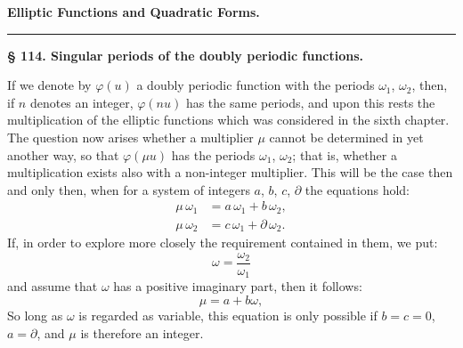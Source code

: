 \begin{center}

\textbf{\Large Elliptic Functions and Quadratic Forms.}

\rule{0.12\linewidth}{0.4pt}
\end{center}

\textbf{§ 114. Singular periods of the doubly periodic functions.}

If we denote by $\varphi(u)$ a doubly periodic function with the periods $\omega_1$, $\omega_2$, then, if $n$ denotes an integer, $\varphi(nu)$ has the same periods, and upon this rests the multiplication of the elliptic functions which was considered in the sixth chapter. The question now arises whether a multiplier $\mu$ cannot be determined in yet another way, so that $\varphi(\mu u)$ has the periods $\omega_1$, $\omega_2$; that is, whether a multiplication exists also with a non-integer multiplier. This will be the case then and only then, when for a system of integers $a$, $b$, $c$, $\partial$ the equations hold:
\[
\begin{aligned}
\mu\,\omega_1 &= a\,\omega_1 + b\,\omega_2,\\
\mu\,\omega_2 &= c\,\omega_1 + \partial\,\omega_2.
\end{aligned}
\]
If, in order to explore more closely the requirement contained in them, we put:
\[
\omega = \dfrac{\omega_2}{\omega_1}
\]
and assume that $\omega$ has a positive imaginary part, then it follows:
\[\mu=a+b\omega,\]
So long as $\omega$ is regarded as variable, this equation is only possible if $b=c=0$, $a=\partial$, and $\mu$ is therefore an integer.
